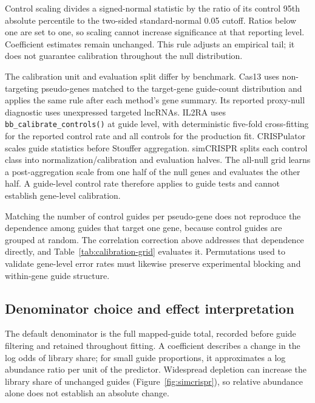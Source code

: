 Control scaling divides a signed-normal statistic by the ratio of its control
95th absolute percentile to the two-sided standard-normal 0.05 cutoff. Ratios
below one are set to one, so scaling cannot increase significance at that
reporting level.  Coefficient estimates remain unchanged.  This rule adjusts
an empirical tail; it does not guarantee calibration throughout the null
distribution.

The calibration unit and evaluation split differ by benchmark.  Cas13 uses
non-targeting pseudo-genes matched to the target-gene guide-count distribution
and applies the same rule after each method's gene summary.  Its reported
proxy-null diagnostic uses unexpressed targeted lncRNAs.  IL2RA uses
\texttt{bb\_calibrate\_controls()} at guide level, with deterministic
five-fold cross-fitting for the reported control rate and all controls for the
production fit.  CRISPulator scales guide statistics before Stouffer
aggregation. simCRISPR splits each control class into
normalization/calibration and evaluation halves.  The all-null grid learns a
post-aggregation scale from one half of the null genes and evaluates the other
half.  A guide-level control rate therefore applies to guide tests and cannot
establish gene-level calibration.

Matching the number of control guides per pseudo-gene does not reproduce the
dependence among guides that target one gene, because control guides are
grouped at random.  The correlation correction above addresses that
dependence directly, and Table~\ref{tab:calibration-grid} evaluates it.
Permutations used to validate gene-level error rates must likewise preserve
experimental blocking and within-gene guide structure.

\subsection{Denominator choice and effect interpretation}

The default denominator is the full mapped-guide total, recorded before guide
filtering and retained throughout fitting.  A coefficient describes a change
in the log odds of library share; for small guide proportions, it approximates
a log abundance ratio per unit of the predictor.  Widespread depletion can
increase the library share of unchanged guides (Figure~\ref{fig:simcrispr}),
so relative abundance alone does not establish an absolute change.

